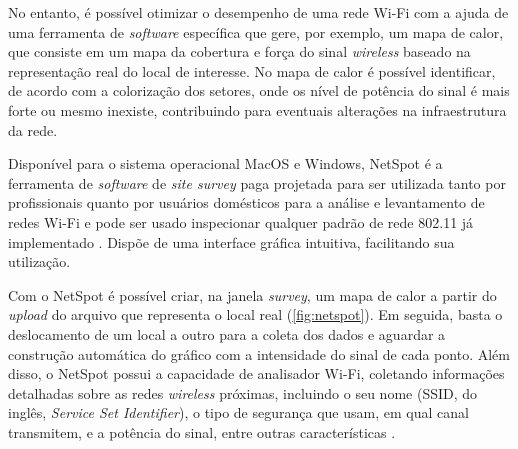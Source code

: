 No entanto, é possível otimizar o desempenho de uma rede Wi-Fi com a ajuda de uma ferramenta de \textit{software} específica que gere, por exemplo, um mapa de calor, que consiste em um mapa da cobertura e força do sinal \textit{wireless} baseado na representação real do local de interesse. No mapa de calor é possível identificar, de acordo com a colorização dos setores, onde os nível de potência do sinal é mais forte ou mesmo inexiste, contribuindo para eventuais alterações na infraestrutura da rede.

\label{subsubsubsec:netspot}

Disponível para o sistema operacional MacOS e Windows, NetSpot é a ferramenta de \textit{software} de \textit{site survey} paga projetada para ser utilizada tanto por profissionais quanto por usuários domésticos para a análise e levantamento de redes Wi-Fi e pode ser usado inspecionar qualquer padrão de rede 802.11 já implementado \cite{Netspot2019}. Dispõe de uma interface gráfica intuitiva, facilitando sua utilização.

Com o NetSpot é possível criar, na janela \textit{survey}, um mapa de calor a partir do \textit{upload} do arquivo que representa o local real (\autoref{fig:netspot}). Em seguida, basta o deslocamento de um local a outro para a coleta dos dados e aguardar a construção automática do gráfico com a intensidade do sinal de cada ponto. Além disso, o NetSpot possui a capacidade de analisador Wi-Fi, coletando informações detalhadas sobre as redes \textit{wireless} próximas, incluindo o seu nome (SSID, do inglês, \textit{Service Set Identifier}), o tipo de segurança que usam, em qual canal transmitem, e a potência do sinal, entre outras características \cite{Netspot2019}.

\begin{figure}[H]
	\centering
\end{figure}

